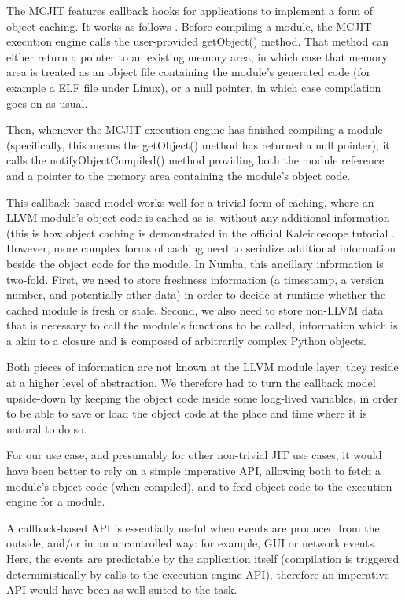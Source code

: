 \documentclass{acm_proc_article-sp}
\begin{document}
The MCJIT features callback hooks for
applications to implement a form of object caching.  It works
as follows \cite{llvmdoc:objectcache}.
Before compiling a module, the MCJIT execution engine
calls the user-provided getObject() method.  That method can either
return a pointer to an existing memory area, in which case that
memory area is treated as an object file containing the module's
generated code (for example a ELF file under Linux), or a null pointer,
in which case compilation goes on as usual.

Then, whenever the MCJIT execution engine has finished compiling a
module (specifically, this means the getObject() method has returned
a null pointer), it calls the notifyObjectCompiled() method providing
both the module reference and a pointer to the memory area containing
the module's object code.

This callback-based model works well for a trivial form of caching,
where an LLVM module's object code is cached as-is, without any
additional information (this is how object caching is demonstrated in
the official Kaleidoscope tutorial \cite{llvmblog:kaleidoscope}.
However, more complex forms of
caching need to serialize additional information beside the object code
for the module.  In Numba, this ancillary information is two-fold.  First,
we need to store freshness information (a timestamp, a version number,
and potentially other data) in order to decide at runtime whether the
cached module is fresh or stale.  Second, we also need to store non-LLVM
data that is necessary to call the module's functions to be called,
information which is a akin to a closure and is composed of arbitrarily
complex Python objects.

Both pieces of information are not known at the LLVM module layer;
they reside at a higher level of abstraction.  We therefore had to
turn the callback model upside-down by keeping the object code inside
some long-lived variables, in order to be able to save or load
the object code at the place and time where it is natural to do so.

For our use case, and presumably for other non-trivial JIT use cases,
it would have been better to rely on a simple imperative API, allowing
both to fetch a module's object code (when compiled), and to feed object
code to the execution engine for a module.

A callback-based API is essentially useful when events are produced from
the outside, and/or in an uncontrolled way: for example, GUI or network
events.  Here, the events are predictable by the application
itself (compilation is triggered deterministically by calls to the
execution engine API), therefore an imperative API would have been as
well suited to the task.
\end{document}
